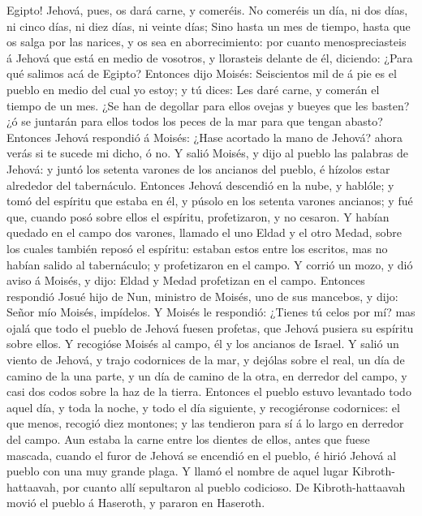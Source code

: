 Egipto! Jehová, pues, os dará carne, y comeréis.  No
comeréis un día, ni dos días, ni cinco días, ni diez días, ni veinte
días;  Sino hasta un mes de tiempo, hasta que os salga por
las narices, y os sea en aborrecimiento: por cuanto menospreciasteis á
Jehová que está en medio de vosotros, y llorasteis delante de él,
diciendo: ¿Para qué salimos acá de Egipto?  Entonces dijo
Moisés: Seiscientos mil de á pie es el pueblo en medio del cual yo
estoy; y tú dices: Les daré carne, y comerán el tiempo de un mes.
 ¿Se han de degollar para ellos ovejas y bueyes que les
basten? ¿ó se juntarán para ellos todos los peces de la mar para que
tengan abasto?  Entonces Jehová respondió á Moisés: ¿Hase
acortado la mano de Jehová? ahora verás si te sucede mi dicho, ó no.
 Y salió Moisés, y dijo al pueblo las palabras de Jehová: y
juntó los setenta varones de los ancianos del pueblo, é hízolos estar
alrededor del tabernáculo.  Entonces Jehová descendió en la
nube, y hablóle; y tomó del espíritu que estaba en él, y púsolo en los
setenta varones ancianos; y fué que, cuando posó sobre ellos el
espíritu, profetizaron, y no cesaron.  Y habían quedado en
el campo dos varones, llamado el uno Eldad y el otro Medad, sobre los
cuales también reposó el espíritu: estaban estos entre los escritos, mas
no habían salido al tabernáculo; y profetizaron en el campo.
 Y corrió un mozo, y dió aviso á Moisés, y dijo: Eldad y
Medad profetizan en el campo.  Entonces respondió Josué
hijo de Nun, ministro de Moisés, uno de sus mancebos, y dijo: Señor mío
Moisés, impídelos.  Y Moisés le respondió: ¿Tienes tú celos
por mí? mas ojalá que todo el pueblo de Jehová fuesen profetas, que
Jehová pusiera su espíritu sobre ellos.  Y recogióse Moisés
al campo, él y los ancianos de Israel.  Y salió un viento
de Jehová, y trajo codornices de la mar, y dejólas sobre el real, un día
de camino de la una parte, y un día de camino de la otra, en derredor
del campo, y casi dos codos sobre la haz de la tierra. 
Entonces el pueblo estuvo levantado todo aquel día, y toda la noche, y
todo el día siguiente, y recogiéronse codornices: el que menos, recogió
diez montones; y las tendieron para sí á lo largo en derredor del campo.
 Aun estaba la carne entre los dientes de ellos, antes que
fuese mascada, cuando el furor de Jehová se encendió en el pueblo, é
hirió Jehová al pueblo con una muy grande plaga.  Y llamó
el nombre de aquel lugar Kibroth-hattaavah, por cuanto allí sepultaron
al pueblo codicioso.  De Kibroth-hattaavah movió el pueblo
á Haseroth, y pararon en Haseroth.

